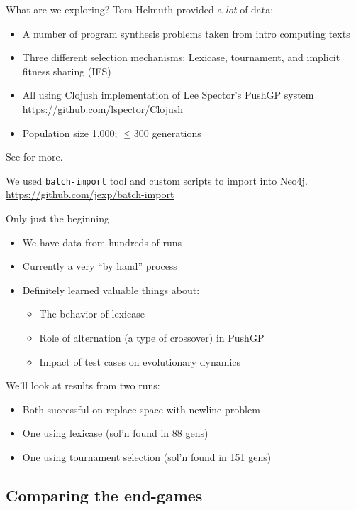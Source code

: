 \documentclass{beamer}
\newcommand{\linespace}{\vskip 0.25cm}
\begin{document}
\begin{frame}{What are we exploring?}
Tom Helmuth provided a \emph{lot} of data:
\begin{itemize}
	\item A number of program synthesis problems taken from intro computing texts
	\item Three different selection mechanisms: Lexicase, tournament, and implicit fitness sharing (IFS)
	\item All using Clojush implementation of Lee Spector's PushGP system \url{https://github.com/lspector/Clojush}
	\item Population size 1,000; $\leq 300$ generations
\end{itemize}
See \cite{Helmuth:GECCO15} for more.

\linespace

We used \texttt{batch-import} tool and custom scripts to import into Neo4j. 
{\tiny \url{https://github.com/jexp/batch-import}} 
\end{frame}

\begin{frame}{Only just the beginning}
	\begin{itemize}
		\item We have data from hundreds of runs
		\item Currently a very ``by hand'' process
		\item Definitely learned valuable things about:
		\begin{itemize}
			\item The behavior of lexicase
			\item Role of alternation (a type of crossover) in PushGP
			\item Impact of test cases on evolutionary dynamics
		\end{itemize}
	\end{itemize}
	
	\linespace
	
	We'll look at results from two runs:
	\begin{itemize}
		\item Both successful on replace-space-with-newline problem
		\item One using lexicase (sol'n found in 88 gens)
		\item One using tournament selection (sol'n found in 151 gens)
	\end{itemize}
\end{frame}

\subsection{Comparing the end-games}
\end{document}
